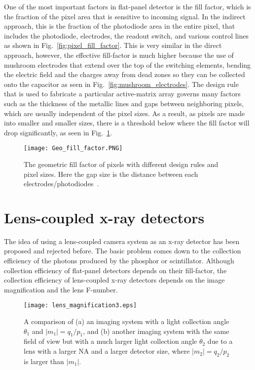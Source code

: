 One of the most important factors in flat-panel detector is the fill factor, which is the fraction of the pixel area that is sensitive to incoming signal.  In the indirect approach, this is the fraction of the photodiode area in the entire pixel, that includes the photodiode, electrodes, the readout switch, and various control lines as shown in Fig.~\ref{fig:pixel_fill_factor}.  This is very similar in the direct approach, however, the effective fill-factor is much higher because the use of mushroom electrodes that extend over the top of the switching elements, bending the electric field and the charges away from dead zones so they can be collected onto the capacitor as seen in Fig.~\ref{fig:mushroom_electrodes}.  The design rule that is used to fabricate a particular active-matrix array governs many factors such as the thickness of the metallic lines and gaps between neighboring pixels, which are usually independent of the pixel sizes.  As a result, as pixels are made into smaller and smaller sizes, there is a threshold below where the fill factor will drop significantly, as seen in Fig.~\ref{fig:fill_factor}.

\begin{figure}[ht]
\texttt{[image: Geo\_fill\_factor.PNG]}
\caption{The geometric fill factor of pixels with different design rules and pixel sizes.  Here the gap size is the distance between each electrodes/photodiodes~\citep{Rowlands2000}.}
\label{fig:fill_factor}
\end{figure}

\section{Lens-coupled x-ray detectors}
The idea of using a lens-coupled camera system as an x-ray detector has been proposed and rejected before.  The basic problem comes down to the collection efficiency of the photons produced by the phosphor or scintillator.  Although collection efficiency of flat-panel detectors depends on their fill-factor, the collection efficiency of lens-coupled x-ray detectors depends on the image magnification and the lens F-number.

\begin{figure}[ht]
\texttt{[image: lens\_magnification3.eps]}
\caption{A comparison of (a) an imaging system with a light collection angle $\theta_1$ and $\lvert m_1 \rvert = q_1/p_1$, and (b) another imaging system with the same field of view but with a much larger light collection angle $\theta_2$ due to a lens with a larger NA and a larger detector size, where $ \lvert m_2 \rvert = q_2/p_2$ is larger than $\lvert m_1 \rvert$.}
\label{fig:lens_magnification}
\end{figure}

